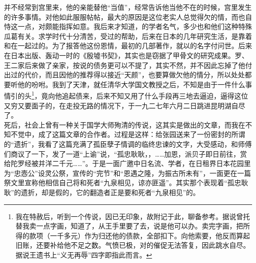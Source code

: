 并不经常到宫里来，他的亲能替他“当值”，经常告诉他当他不在的时候，宫里发生的许多事情。对他如此服服帖帖，最大的原因是这位老实人总觉得欠的情，而也自恃这一点，对颇能指挥如意。我后来才知道，的学者名气，多少也和他们这种特殊瓜葛有关。求学时代十分清苦，受过的帮助，后来在日本的几年研究生活，是靠着和在一起过的。为了报答他这份恩情，最初的几部著作，就以的名字付问世。后来在日本出版、轰动一时的《殷墟书契》，其实也是窃据了甲骨文的研究成果。罗、王二家后来做了亲家，按说的债务更可以不提了，其实不然，并不因此忘掉了他付出过的代价，而且因他的推荐得以接近“天颜”，也要算做欠他的情分，所以处处都要听他的吩咐。我到了天津，就任清华大学国文教授之后，不知是由于一件什么事情引的头\footnote{我在特赦后，听到一个传说，因已无印象，故附记于此，聊备参考。据说曾托替我卖一点字画，知道了，从王手里要了去，说是他可以办。卖完字画，把所得的款项（一千多元）作为归还他的债款，全部扣下。向他索要，他反而算起旧账，还要补给他不足之数。气愤已极，对的催促无法答复，因此跳水自尽。据说王遗书上“义无再辱”四字即指此而言。}，竟向他追起债来，后来不知又用了什么手段再三地去逼迫，逼得这位又穷又要面子的，在走投无路的情况下，于一九二七年六月二日跳进昆明湖自尽了。\\

死后，社会上曾有一种关于国学大师殉清的传说，这其实是做出的文章，而我在不知不觉中，成了这篇文章的合作者。过程是这样：给张园送来了一份密封的所谓的“遗折”，我看了这篇充满了孤臣孽子情调的临终忠谏的文字，大受感动，和师傅们商议了一下，发了一道“上谕”说，“孤忠耿耿，，……加恩，派贝子即日前往，赏给陀罗经被并洋二千元……”。于是一面广邀中日名流、学者，在日租界日本花园里为“忠悫公”设灵公祭，宣传的“完节”和“恩遇之隆，为振古所未有”，一面更在一篇祭文里宣称他相信自己将和死者“九泉相见，谅亦匪遥”。其实那个表现着“孤忠耿耿”的遗折，却是假的，它的翻造者正是要和死者“九泉相见”的。\\

